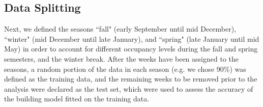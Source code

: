 
\subsection{Data Splitting}
Next, we defined the seasons ``fall" (early September until mid December), ``winter" (mid December until late January), and ``spring" (late January until mid May) in order to account for different occupancy levels during the fall and spring semesters, and the winter break. After the weeks have been assigned to the seasons, a random portion of the data in each season (e.g. we chose 90\%) was defined as the training data, and the remaining weeks to be removed prior to the analysis were declared as the test set, which were used to assess the accuracy of the building model fitted on the training data.


